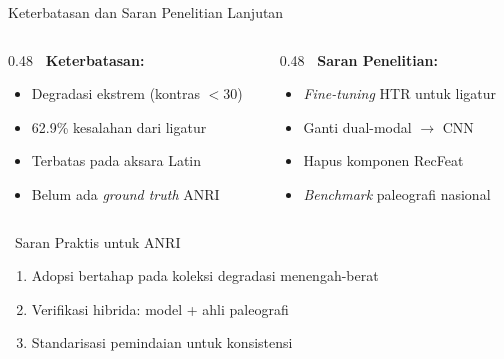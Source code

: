 \documentclass[aspectratio=169,10pt,t]{beamer}
\begin{document}
\begin{frame}[shrink=5]{Keterbatasan dan Saran Penelitian Lanjutan}
    \begin{columns}[T]
        \begin{column}{0.48\textwidth}
            \textbf{\faExclamationTriangle~Keterbatasan:}
            \begin{itemize}
                \item Degradasi ekstrem (kontras $<$30)
                \item 62.9\% kesalahan dari ligatur
                \item Terbatas pada aksara Latin
                \item Belum ada \textit{ground truth} ANRI
            \end{itemize}
        \end{column}
        \begin{column}{0.48\textwidth}
            \textbf{\faRocket~Saran Penelitian:}
            \begin{itemize}
                \item \textit{Fine-tuning} HTR untuk ligatur
                \item Ganti dual-modal $\rightarrow$ CNN
                \item Hapus komponen RecFeat
                \item \textit{Benchmark} paleografi nasional
            \end{itemize}
        \end{column}
    \end{columns}
    
    \vspace{0.8em}
    \begin{block}{\faHandshake~Saran Praktis untuk ANRI}
        \begin{enumerate}
            \item Adopsi bertahap pada koleksi degradasi menengah-berat
            \item Verifikasi hibrida: model + ahli paleografi
            \item Standarisasi pemindaian untuk konsistensi
        \end{enumerate}
    \end{block}
\end{frame}
\end{document}
